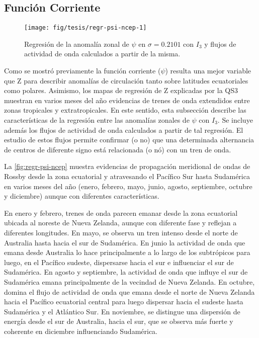 \documentclass[spanish,a4paper,12p]{book}
\begin{document}
\subsection{Función Corriente}\label{funcion-corriente-1}

\begin{landscape}\begin{figure}

{\centering \texttt{[image: fig/tesis/regr-psi-ncep-1]} 

}

\caption{Regresión de la anomalía zonal de $\psi$ en $\sigma = 0.2101$ con $I_3$ y flujos de actividad de onda calculados a partir de la misma.}\label{fig:regr-psi-ncep}
\end{figure}
\end{landscape}

Como se mostró previamente la función corriente (\(\psi\)) resulta una
mejor variable que Z para describir anomalías de circulación tanto sobre
latitudes ecuatoriales como polares. Asimismo, los mapas de regresión de
Z explicadas por la QS3 muestran en varios meses del año evidencias de
trenes de onda extendidos entre zonas tropicales y extratropicales. En
este sentido, esta subsección describe las características de la
regresión entre las anomalías zonales de \(\psi\) con \(I_3\). Se
incluye además los flujos de actividad de onda calculados a partir de
tal regresión. El estudio de estos flujos permite confirmar (o no) que
una determinada alternancia de centros de diferente signo está
relacionada (o nó) con un tren de onda.

La \autoref{fig:regr-psi-ncep} muestra evidencias de propagación
meridional de ondas de Rossby desde la zona ecuatorial y atravesando el
Pacífico Sur hasta Sudamérica en varios meses del año (enero, febrero,
mayo, junio, agosto, septiembre, octubre y diciembre) aunque con
diferentes características.

En enero y febrero, trenes de onda parecen emanar desde la zona
ecuatorial ubicada al noreste de Nueva Zelanda, aunque con diferente
fase y reflejan a diferentes longitudes. En mayo, se observa un tren
intenso desde el norte de Australia hasta hacia el sur de Sudamérica. En
junio la actividad de onda que emana desde Australia lo hace
principalmente a lo largo de los subtrópicos para luego, en el Pacífico
sudeste, dispersarse hacia el sur e influenciar el sur de Sudamérica. En
agosto y septiembre, la actividad de onda que influye el sur de
Sudamérica emana principalmente de la vecindad de Nueva Zelanda. En
octubre, domina el flujo de actividad de onda que emana desde el norte
de Nueva Zelanda hacia el Pacífico ecuatorial central para luego
dispersar hacia el sudeste hasta Sudamérica y el Atlántico Sur. En
noviembre, se distingue una dispersión de energía desde el sur de
Australia, hacia el sur, que se observa más fuerte y coherente en
diciembre influenciando Sudamérica.
\end{document}
